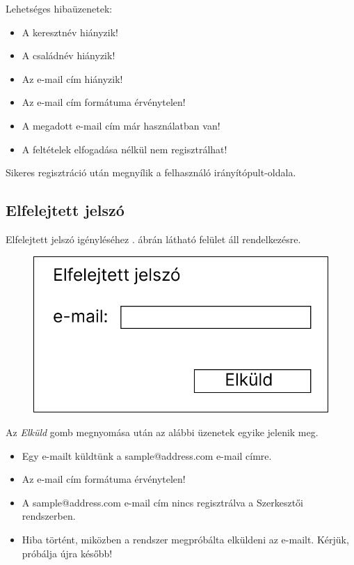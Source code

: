 \documentclass[a4paper,12pt]{article}
\begin{document}
Lehetséges hibaüzenetek:
\begin{itemize}
	\item A keresztnév hiányzik!
	\item A családnév hiányzik!
	\item Az e-mail cím hiányzik!
	\item Az e-mail cím formátuma érvénytelen!
	\item A megadott e-mail cím már használatban van!
	\item A feltételek elfogadása nélkül nem regisztrálhat!
\end{itemize}

Sikeres regisztráció után megnyílik a felhasználó irányítópult-oldala.

\subsection{Elfelejtett jelszó}

Elfelejtett jelszó igényléséhez . ábrán látható felület áll rendelkezésre.

\begin{figure}
	\centering
	\includegraphics[width=\textwidth]{images/Web_pages/Forgotten_Password.jpg}
	\caption{}
	\label{fig:Forgotten_Password}
\end{figure}

Az \textit{Elküld} gomb megnyomása után az alábbi üzenetek egyike jelenik meg.
\begin{itemize}
	\item Egy e-mailt küldtünk a sample@address.com e-mail címre.
	\item Az e-mail cím formátuma érvénytelen!
	\item A sample@address.com e-mail cím nincs regisztrálva a Szerkesztői rendszerben.
	\item Hiba történt, miközben a rendszer megpróbálta elküldeni az e-mailt. Kérjük, próbálja újra később!
\end{itemize}
\end{document}
